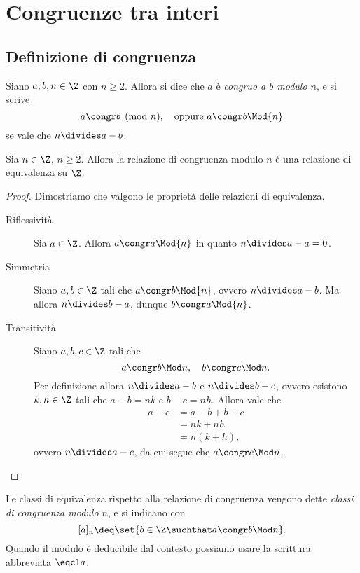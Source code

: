 \chapter{Congruenze tra interi}

\section{Definizione di congruenza}

\begin{definition}
    Siano $a, b, n \in \Z$ con $n \geq 2$. Allora si dice che $a$ è \emph{congruo a $b$ modulo $n$}, e si scrive \[
        a \congr b \pmod{n},  \quad \text{oppure }  a \congr b \Mod{n}
    \] se vale che $n \divides a - b$. 
\end{definition}

\begin{proposition}
    Sia $n \in \Z$, $n \geq 2$. Allora la relazione di congruenza modulo $n$ è una relazione di equivalenza su $\Z$.
\end{proposition}
\begin{proof}
    Dimostriamo che valgono le proprietà delle relazioni di equivalenza.
    \begin{description}
        \item[Riflessività] Sia $a \in \Z$. Allora $a \congr a \Mod{n}$ in quanto $n \divides a-a = 0$.
        \item[Simmetria] Siano $a, b \in \Z$ tali che $a \congr b \Mod{n}$, ovvero $n \divides a - b$. Ma allora $n \divides b-a$, dunque $b \congr a \Mod{n}$.
        \item[Transitività] Siano $a, b, c \in \Z$ tali che \[
            a \congr b \Mod n, \quad b \congr c \Mod n.    
        \] Per definizione allora $n \divides a - b$ e $n \divides b-c$, ovvero esistono $k, h \in \Z$ tali che $a - b = nk$ e $b - c = nh$.
        Allora vale che \begin{align*}
            a - c &= a - b + b - c \\
            &= nk + nh \\
            &= n(k + h),
        \end{align*} ovvero $n \divides a - c$, da cui segue che $a \congr c \Mod n$. \qedhere
    \end{description}
\end{proof}

Le classi di equivalenza rispetto alla relazione di congruenza vengono dette \emph{classi di congruenza modulo $n$}, e si indicano con \[
    [a]_n \deq \set{b \in \Z \suchthat a \congr b \Mod n}.    
\] Quando il modulo è deducibile dal contesto possiamo usare la scrittura abbreviata $\eqcl a$.

